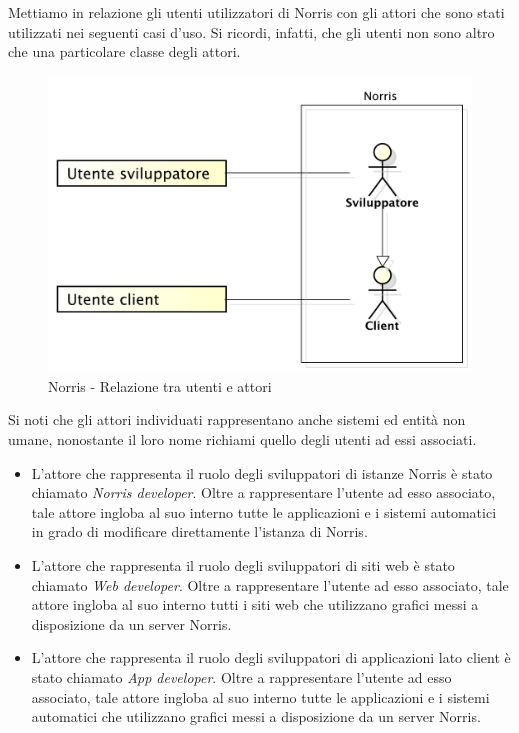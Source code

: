 	Mettiamo in relazione gli utenti utilizzatori di Norris con gli attori che sono stati utilizzati nei seguenti casi d'uso. Si ricordi, infatti, che gli utenti non sono altro che una particolare classe degli attori.
	\begin{figure}[H]
		\centering
		\includegraphics[scale=0.4]{Pics/UtentiAttoriNorris}
		\caption{Norris - Relazione tra utenti e attori}
	\end{figure}
	Si noti che gli attori individuati rappresentano anche sistemi ed entità non umane, nonostante il loro nome richiami quello degli utenti ad essi associati.
	\begin{itemize}
		\item L'attore che rappresenta il ruolo degli sviluppatori di istanze Norris è stato chiamato \emph{Norris developer}. Oltre a rappresentare l'utente ad esso associato, tale attore ingloba al suo interno tutte le applicazioni e i sistemi automatici in grado di modificare direttamente l'istanza di Norris.
		\item L'attore che rappresenta il ruolo degli sviluppatori di siti web è stato chiamato \emph{Web developer}. Oltre a rappresentare l'utente ad esso associato, tale attore ingloba al suo interno tutti i siti web che utilizzano grafici messi a disposizione da un server Norris.
		\item L'attore che rappresenta il ruolo degli sviluppatori di applicazioni lato client è stato chiamato \emph{App developer}. Oltre a rappresentare l'utente ad esso associato, tale attore ingloba al suo interno tutte le applicazioni e i sistemi automatici che utilizzano grafici messi a disposizione da un server Norris.
	\end{itemize}
	

